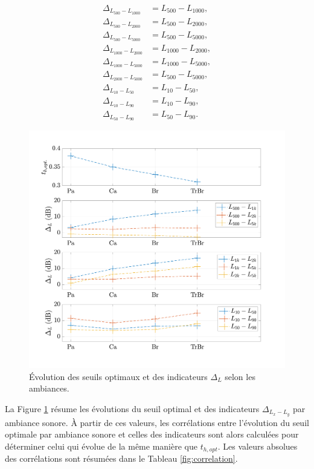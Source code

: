 \begin{subequations}\label{eq:delta_L}
\begin{align}
\Delta_{L_{500}-L_{1000}} &= L_{500}-L_{1000}, \\
\Delta_{L_{500}-L_{2000}} &= L_{500}-L_{2000}, \\
\Delta_{L_{500}-L_{5000}} &= L_{500}-L_{5000}, \\
\Delta_{L_{1000}-L_{2000}} &= L_{1000}-L_{2000}, \\
\Delta_{L_{1000}-L_{5000}} &= L_{1000}-L_{5000}, \\
\Delta_{L_{2000}-L_{5000}} &= L_{500}-L_{5000}, \\
\Delta_{L_{10}-L_{50}} &= L_{10}-L_{50}, \\
\Delta_{L_{10}-L_{90}} &= L_{10}-L_{90}, \\
\Delta_{L_{50}-L_{90}} &= L_{50}-L_{90}.
\end{align}
\end{subequations}

\begin{figure}[h]
\centering
\includegraphics[width=0.9\linewidth]{./figures/resultats/deltaL_opt.pdf}
\caption{Évolution des seuils optimaux et des indicateurs $\Delta_L$ selon les ambiances.}
\label{fig:delta_L}
\end{figure}


La Figure \ref{fig:delta_L} résume les évolutions du seuil optimal et des indicateurs $\Delta_{L_x-L_y}$ par ambiance sonore. \`A partir de ces valeurs, les corrélations entre l'évolution du seuil optimale par ambiance sonore et celles des indicateurs sont alors calculées pour déterminer celui qui évolue de la même manière que $t_{h,opt}$. Les valeurs absolues des corrélations sont résumées dans le Tableau \ref{fig:correlation}.

